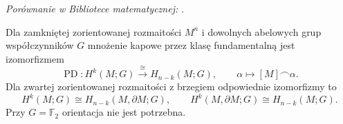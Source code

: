 \noindent\emph{Porównanie w Bibliotece matematycznej:} .

\begin{twierdzenie}
\label{thm:poincare-dualnosc-16}
Dla zamkniętej zorientowanej
rozmaitości $M^n$ i dowolnych
abelowych grup współczynników $G$ mnożenie
kapowe przez klasę fundamentalną
jest izomorfizmem
\[
 \operatorname{PD}:H^k(M;G)
       \stackrel{\cong}{\longrightarrow}
       H_{n-k}(M;G),\qquad
 \alpha\longmapsto[M]\frown\alpha.
\]
Dla zwartej zorientowanej
rozmaitości z brzegiem
odpowiednie izomorfizmy to
\[
 H^k(M;G)\cong H_{n-k}(M,\partial M;G),
 \qquad
 H^k(M,\partial M;G)\cong H_{n-k}(M;G).
\]
Przy $G=\mathbb F_2$ orientacja
nie jest potrzebna.
\end{twierdzenie}
